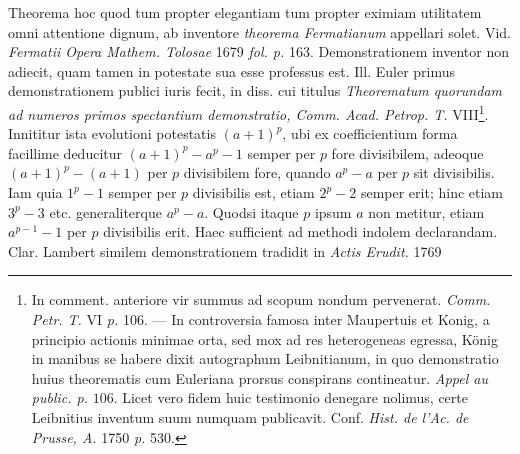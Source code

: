 Theorema hoc quod tum propter elegantiam tum propter eximiam utilitatem omni attentione dignum, ab inventore \emph{theorema Fermatianum} appellari solet. Vid. \emph{Fermatii Opera Mathem. Tolosae} 1679 \emph{fol. p.} 163. Demonstrationem inventor non adiecit, quam tamen in potestate sua esse professus est. Ill. Euler primus demonstrationem publici iuris fecit, in diss. cui titulus \emph{Theorematum quorundam ad numeros primos spectantium demonstratio, Comm. Acad. Petrop. T.} VIII\begingroup\renewcommand{\thefootnote}{*)}\footnote{In comment. anteriore vir summus ad scopum nondum pervenerat. \emph{Comm. Petr. T.} VI \emph{p.} 106. --- In controversia famosa inter Maupertuis et Konig, a principio actionis minimae orta, sed mox ad res heterogeneas egressa, K\"onig in manibus se habere dixit autographum Leibnitianum, in quo demonstratio huius theorematis cum Euleriana prorsus conspirans contineatur. \emph{Appel au public. p.} $106$. Licet vero fidem huic testimonio denegare nolimus, certe Leibnitius inventum suum numquam publicavit. Conf. \emph{Hist. de l'Ac. de Prusse, A.} 1750 \emph{p.} 530.}\endgroup. Innititur ista evolutioni potestatis $(a+1)^p$, ubi ex coefficientium forma facillime deducitur $(a+1)^p-a^p-1$ semper per $p$ fore divisibilem, adeoque $(a+1)^p-(a+1)$ per $p$ divisibilem fore, quando $a^p-a$ per $p$ sit divisibilis. Iam quia $1^p-1$ semper per $p$ divisibilis est, etiam $2^p-2$ semper erit; hinc etiam $3^p-3$ etc. generaliterque $a^p-a$. Quodsi itaque $p$ ipsum $a$ non metitur, etiam $a^{p-1}-1$ per $p$ divisibilis erit. Haec sufficient ad methodi indolem declarandam. Clar. Lambert similem demonstrationem tradidit in \emph{Actis Erudit.} 1769
